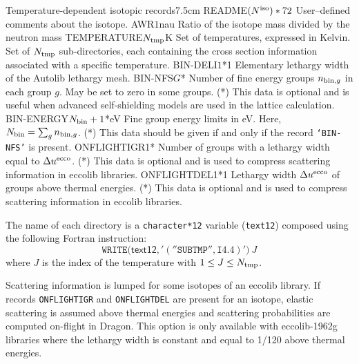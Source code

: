 \begin{DescriptionEnregistrement}{Temperature-dependent isotopic records}{7.5cm}
\label{tabl:tabiso201}
\CharEnr
  {README}{$(N^{\rm iso})*72$}
  {User--defined comments about the isotope.}
\RealEnr
  {AWR}{$1$}{nau}
  {Ratio of the isotope mass divided by the neutron mass}
\RealEnr
  {TEMPERATURE}{$N_{\rm tmp}$}{K}
  {Set of temperatures, expressed in Kelvin.}
\DirVar
  {}
  {Set of $N_{\rm tmp}$ sub-directories, each containing the cross section information
   associated with a specific temperature.}
\OptRealEnr
  {BIN-DELI}{$1$}{*}{1}
  {Elementary lethargy width of the Autolib lethargy mesh.}
\OptIntEnr
  {BIN-NFS}{$G$}{*}
  {Number of fine energy groups $n_{{\rm bin},g}$ in each group $g$. May be set to zero
  in some groups. (*) This data is optional and is useful when advanced self-shielding
  models are used in the lattice calculation.}
\OptRealEnr
  {BIN-ENERGY}{$N_{\rm bin}+1$}{*}{eV}
  {Fine group energy limits in eV. Here, $N_{\rm bin}=\sum_g n_{{\rm bin},g}$. (*) This data
  should be given if and only if the record {\tt `BIN-NFS'} is present.}
\OptIntEnr
  {ONFLIGHTIGR}{1}{*}
  {Number of groups with a lethargy width equal to $\Delta u^{\rm ecco}$. (*) This data is optional and is used to compress scattering information
  in eccolib libraries.}
\OptRealEnr
  {ONFLIGHTDEL}{1}{*}{1}
  {Lethargy width $\Delta u^{\rm ecco}$ of groups above thermal energies. (*) This data is optional and is used to compress scattering information
  in eccolib libraries.}
\end{DescriptionEnregistrement}

The name of each  directory is a {\tt character*12} variable ({\tt text12})
composed using the following Fortran instruction:
$$
\mathtt{WRITE(}\mathsf{text12}\mathtt{,'(''SUBTMP'',I4.4)')}\: J
$$
where $J$ is the index of the temperature with $1 \leq J \le N_{\rm tmp}$.

\vskip 0.2cm

Scattering information is lumped for some isotopes of an eccolib library. If records {\tt ONFLIGHTIGR} and
{\tt ONFLIGHTDEL} are present for an isotope, elastic scattering is assumed above thermal energies and
scattering probabilities are computed on-flight in Dragon. This option is only available with eccolib-1962g
libraries where the lethargy width is constant and equal to 1/120 above thermal energies.

\vskip 0.2cm

